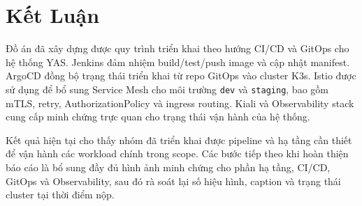 \section{Kết Luận}

Đồ án đã xây dựng được quy trình triển khai theo hướng CI/CD và GitOps cho hệ thống YAS. Jenkins đảm nhiệm build/test/push image và cập nhật manifest. ArgoCD đồng bộ trạng thái triển khai từ repo GitOps vào cluster K3s. Istio được sử dụng để bổ sung Service Mesh cho môi trường \texttt{dev} và \texttt{staging}, bao gồm mTLS, retry, AuthorizationPolicy và ingress routing. Kiali và Observability stack cung cấp minh chứng trực quan cho trạng thái vận hành của hệ thống.

Kết quả hiện tại cho thấy nhóm đã triển khai được pipeline và hạ tầng cần thiết để vận hành các workload chính trong scope. Các bước tiếp theo khi hoàn thiện báo cáo là bổ sung đầy đủ hình ảnh minh chứng cho phần hạ tầng, CI/CD, GitOps và Observability, sau đó rà soát lại số hiệu hình, caption và trạng thái cluster tại thời điểm nộp.
